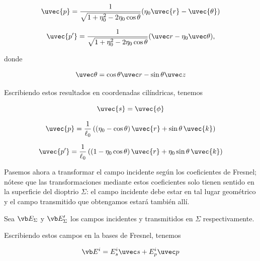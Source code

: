 \begin{equation}
    \uvec{p} = \frac{1}{\sqrt{1+\eta_0^2 - 2\eta_0\cos\theta}} (\eta_0\uvec{r} - \uvec{\theta})
    \label{eq:p_mode}
\end{equation}

\begin{equation}
    \uvec{p'} = \frac{1}{\sqrt{1+\eta_0^2 - 2\eta_0\cos\theta}}(\uvec r - \eta_0\uvec \theta),
    \label{eq:p_prime_mode}
\end{equation}

donde 

\begin{equation}
    \uvec \theta = \cos\theta \uvec r - \sin\theta\uvec z
    \label{eq:unit_theta_def}
\end{equation}


Escribiendo estos resultados en coordenadas cilíndricas, tenemos

\begin{equation}
    \uvec{s} = \uvec{\phi}
    \label{eq:s_mode_cyl}
\end{equation}

\begin{equation}
    \uvec{p} = \frac{1}{\ell_0} \left( \left( \eta_0 - \cos\theta \right)\uvec{r} + \sin\theta \,\uvec{k} \right)
    \label{eq:p_cyl}
\end{equation}

\begin{equation}
    \uvec{p'} = \frac{1}{\ell_0} \left( \left( 1 - \eta_0 \cos\theta \right)\uvec{r} + \eta_0 \sin\theta \,\uvec{k} \right)
    \label{eq:p_prime_cyl}
\end{equation}



Pasemos ahora a transformar el campo incidente según los coeficientes de Fresnel;
nótese que las transformaciones mediante estos coeficientes solo tienen sentido
en la superficie del dioptrio $\Sigma$: el campo incidente debe estar en tal lugar geométrico y el campo transmitido que obtengamos estará también allí.

Sea $\vb E_\Sigma$ y $\vb E'_{\Sigma}$ los campos incidentes y transmitidos en $\Sigma$ respectivamente. 

Escribiendo estos campos en la bases de Fresnel, tenemos 


\begin{equation}
    \vb E^i = E^i_s \uvec s + E^i_p \uvec p 
    \label{eq:E_incidente}
\end{equation}

